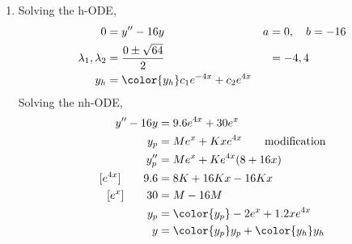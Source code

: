 \begin{enumerate}
    \item Solving the h-ODE,
          \begin{align}
              0                        & = y'' - 16y                              &
              a                        & = 0, \quad b = -16                         \\
              \lambda_{1}, \lambda_{2} & = \frac{0 \pm \sqrt{64}}{2}              &
                                       & = -4, 4                                    \\
              y_{h}                    & = \color{y_h} c_{1}e^{-4x} + c_{2}e^{4x}
          \end{align}
          Solving the nh-ODE,
          \begin{align}
              y'' - 16y           & = 9.6e^{4x} + 30e^{x}                       \\
              y_{p}               & = Me^{x} + Kxe^{4x}
              \qquad \text{modification}                                        \\
              y_{p}''             & = Me^{x} + Ke^{4x}(8 + 16x)                 \\
              [e^{4x}] \qquad 9.6 & = 8K + 16Kx - 16Kx                          \\
              [e^{x}] \qquad 30   & = M - 16M                                   \\
              y_{p}               & = \color{y_p} -2e^{x} + 1.2xe^{4x}          \\
              y                   & = {\color{y_p} y_{p}} + {\color{y_h} y_{h}}
          \end{align}


\end{enumerate}
